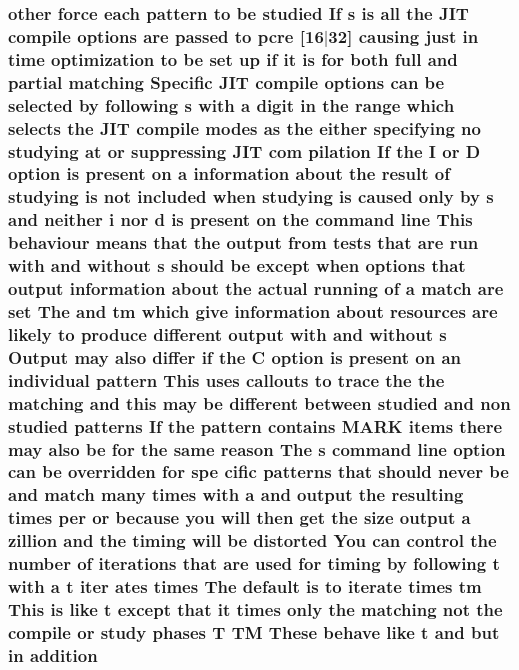 \subsubsection[{\texorpdfstring{addition}{addition}}]{ other force each {\bf pattern} {\bf to} {\bf be} {\bf studied} If {\bf s} {\bf is} {\bf all} the J\+IT {\bf compile} {\bf options} {\bf are} passed {\bf to} {\bf pcre} \mbox{[}16$\vert$32\mbox{]} causing just {\bf in} {\bf time} optimization {\bf to} {\bf be} {\bf set} up {\bf if} {\bf it} {\bf is} for both full and {\bf partial} {\bf matching} Specific J\+IT {\bf compile} {\bf options} {\bf can} {\bf be} {\bf selected} by following {\bf s} {\bf with} {\bf a} digit {\bf in} the range {\bf which} selects the J\+IT {\bf compile} {\bf modes} {\bf as} the either {\bf specifying} no {\bf studying} at {\bf or} suppressing J\+IT com pilation If the {\bf I} {\bf or} {\bf D} {\bf option} {\bf is} {\bf present} {\bf on} {\bf a} information about the {\bf result} {\bf of} {\bf studying} {\bf is} {\bf not} {\bf included} when {\bf studying} {\bf is} caused only by {\bf s} and neither {\bf i} nor {\bf d} {\bf is} {\bf present} {\bf on} the {\bf command} {\bf line} This behaviour means that the {\bf output} {\bf from} {\bf tests} that {\bf are} {\bf run} {\bf with} and without {\bf s} should {\bf be} {\bf except} when {\bf options} that {\bf output} information about the actual running {\bf of} {\bf a} {\bf match} {\bf are} {\bf set} The and {\bf tm} {\bf which} give information about resources {\bf are} likely {\bf to} produce different {\bf output} {\bf with} and without {\bf s} Output may also differ {\bf if} the {\bf C} {\bf option} {\bf is} {\bf present} {\bf on} an individual {\bf pattern} This uses callouts {\bf to} trace the the {\bf matching} and {\bf this} may {\bf be} different between {\bf studied} and non {\bf studied} {\bf patterns} If the {\bf pattern} {\bf contains} M\+A\+RK items there may also {\bf be} for the same {\bf reason} The {\bf s} {\bf command} {\bf line} {\bf option} {\bf can} {\bf be} overridden for spe cific {\bf patterns} that should never {\bf be} and {\bf match} many {\bf times} {\bf with} {\bf a} and {\bf output} the resulting {\bf times} per {\bf or} because you will then get the {\bf size} {\bf output} {\bf a} zillion and the timing will {\bf be} distorted You {\bf can} control the {\bf number} {\bf of} iterations that {\bf are} {\bf used} for timing by following {\bf t} {\bf with} {\bf a} {\bf t} {\bf iter} ates {\bf times} The {\bf default} {\bf is} {\bf to} iterate {\bf times} {\bf tm} This {\bf is} like {\bf t} {\bf except} that {\bf it} {\bf times} only the {\bf matching} {\bf not} the {\bf compile} {\bf or} {\bf study} phases {\bf T} TM These behave like {\bf t} and but {\bf in} addition}\hypertarget{pcretest_8txt_a301089170caa67494e8d05f89788340a}{}\label{pcretest_8txt_a301089170caa67494e8d05f89788340a}
